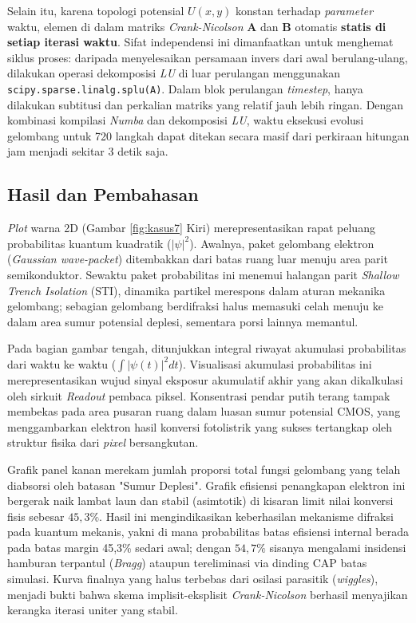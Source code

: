 \documentclass[11pt,a4paper]{article}
\begin{document}
Selain itu, karena topologi potensial $U(x,y)$ konstan terhadap \textit{parameter} waktu, elemen di dalam matriks \textit{Crank-Nicolson} $\mathbf{A}$ dan $\mathbf{B}$ otomatis \textbf{statis di setiap iterasi waktu}. Sifat independensi ini dimanfaatkan untuk menghemat siklus proses: daripada menyelesaikan persamaan invers dari awal berulang-ulang, dilakukan operasi dekomposisi \textit{LU} di luar perulangan menggunakan \texttt{scipy.sparse.linalg.splu(A)}. Dalam blok perulangan \textit{timestep}, hanya dilakukan subtitusi dan perkalian matriks yang relatif jauh lebih ringan. Dengan kombinasi kompilasi \textit{Numba} dan dekomposisi \textit{LU}, waktu eksekusi evolusi gelombang untuk 720 langkah dapat ditekan secara masif dari perkiraan hitungan jam menjadi sekitar 3 detik saja.

\subsection{Hasil dan Pembahasan}

\textit{Plot} warna 2D (Gambar \ref{fig:kasus7} Kiri) merepresentasikan rapat peluang probabilitas kuantum kuadratik ($|\psi|^2$). Awalnya, paket gelombang elektron (\textit{Gaussian wave-packet}) ditembakkan dari batas ruang luar menuju area parit semikonduktor. Sewaktu paket probabilitas ini menemui halangan parit \textit{Shallow Trench Isolation} (STI), dinamika partikel merespons dalam aturan mekanika gelombang; sebagian gelombang berdifraksi halus memasuki celah menuju ke dalam area sumur potensial deplesi, sementara porsi lainnya memantul.

Pada bagian gambar tengah, ditunjukkan integral riwayat akumulasi probabilitas dari waktu ke waktu ($\int |\psi(t)|^2 dt$). Visualisasi akumulasi probabilitas ini merepresentasikan wujud sinyal eksposur akumulatif akhir yang akan dikalkulasi oleh sirkuit \textit{Readout} pembaca piksel. Konsentrasi pendar putih terang tampak membekas pada area pusaran ruang dalam luasan sumur potensial CMOS, yang menggambarkan elektron hasil konversi fotolistrik yang sukses tertangkap oleh struktur fisika dari \textit{pixel} bersangkutan.

Grafik panel kanan merekam jumlah proporsi total fungsi gelombang yang telah diabsorsi oleh batasan "Sumur Deplesi". Grafik efisiensi penangkapan elektron ini bergerak naik lambat laun dan stabil (asimtotik) di kisaran limit nilai konversi fisis sebesar $45,3\%$. Hasil ini mengindikasikan keberhasilan mekanisme difraksi pada kuantum mekanis, yakni di mana probabilitas batas efisiensi internal berada pada batas margin 45,3\% sedari awal; dengan $54,7\%$ sisanya mengalami insidensi hamburan terpantul (\textit{Bragg}) ataupun tereliminasi via dinding CAP batas simulasi. Kurva finalnya yang halus terbebas dari osilasi parasitik (\textit{wiggles}), menjadi bukti bahwa skema implisit-eksplisit \textit{Crank-Nicolson} berhasil menyajikan kerangka iterasi uniter yang stabil.
\end{document}
